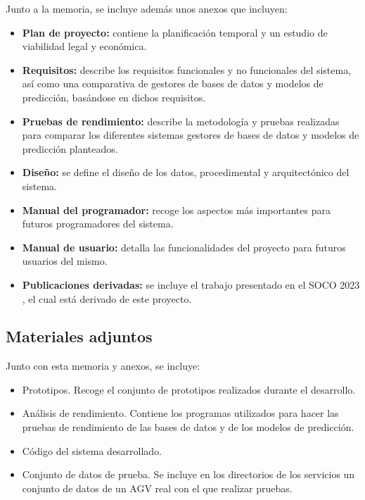 Junto a la memoria, se incluye además unos anexos que incluyen:
\begin{itemize}
    \item \textbf{Plan de proyecto:} contiene la planificación temporal y un estudio de viabilidad legal y
        económica.
    \item \textbf{Requisitos:} describe los requisitos funcionales y no funcionales del sistema, así como una
        comparativa de gestores de bases de datos y modelos de predicción, basándose en dichos requisitos.
    \item \textbf{Pruebas de rendimiento:} describe la metodología y pruebas realizadas para comparar los diferentes
        sistemas gestores de bases de datos y modelos de predicción planteados.
    \item \textbf{Diseño:} se define el diseño de los datos, procedimental y arquitectónico del sistema.
    \item \textbf{Manual del programador:} recoge los aspectos más importantes para futuros programadores del sistema.
    \item \textbf{Manual de usuario:} detalla las funcionalidades del proyecto para futuros usuarios del
        mismo.
    \item \textbf{Publicaciones derivadas:} se incluye el trabajo presentado en el SOCO 2023 \cite{8364SOCO}, el cual 
        está derivado de este proyecto. 
\end{itemize}

\subsection{Materiales adjuntos}

Junto con esta memoria y anexos, se incluye:
\begin{itemize}
    \item Prototipos. Recoge el conjunto de prototipos realizados durante el desarrollo.
    \item Análisis de rendimiento. Contiene los programas utilizados para hacer las pruebas de rendimiento 
        de las bases de datos y de los modelos de predicción.
    \item Código del sistema desarrollado.
    \item Conjunto de datos de prueba. Se incluye en los directorios de los servicios un conjunto de datos de un AGV 
        real con el que realizar pruebas.
\end{itemize}